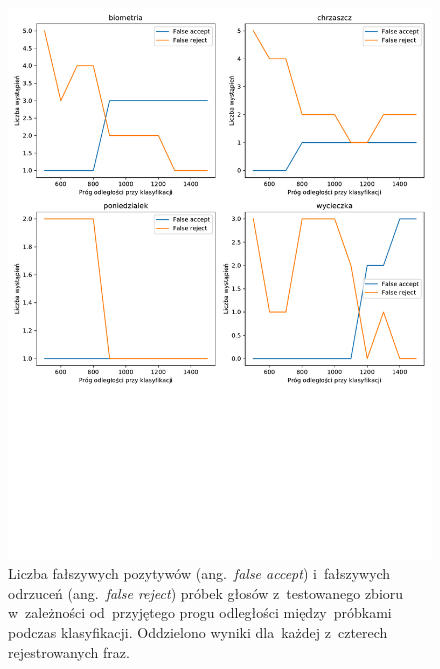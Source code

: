 \documentclass[11pt,a4paper]{article}
\begin{document}
\begin{figure}
    \centering
    \includegraphics[width=\textwidth]{res/plots/acceptance_rates.pdf}
    \caption{Liczba fałszywych pozytywów (ang.~\emph{false accept}) i~fałszywych odrzuceń (ang.~\emph{false reject}) próbek głosów z~testowanego zbioru w~zależności od~przyjętego progu odległości między~próbkami podczas klasyfikacji.
    Oddzielono wyniki dla~każdej z~czterech rejestrowanych fraz.}
    \label{fig:acceptance-rates}
\end{figure}
\end{document}
